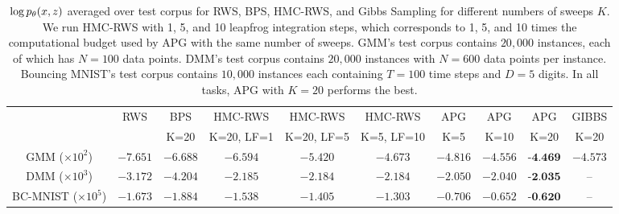 \documentclass{article}
\theoremstyle{definition}
\begin{document}
\begin{table}[t!]
\centering
\caption{$\log p_\theta (x, z)$ averaged over test corpus for RWS, BPS, HMC-RWS, and Gibbs Sampling for different numbers of sweeps $K$.
We run HMC-RWS with 1, 5, and 10 leapfrog integration steps, which corresponds to 1, 5, and 10 times the computational budget used by APG with the same number of sweeps.
GMM's test corpus contains $20,000$ instances, each of which has $N=100$ data points. DMM's test corpus contains $20,000$ instances with $N=600$ data points per instance. Bouncing MNIST's test corpus contains $10,000$ instances each containing $T=100$ time steps and $D=5$ digits.
In all tasks, APG with $K=20$ performs the best.}
\vspace{0.5em}
\addtolength{\tabcolsep}{-2pt} 
\begin{tabularx}{\textwidth}{cccccccccc}
    \toprule
     & RWS & BPS & HMC-RWS & HMC-RWS & HMC-RWS & APG & APG & APG & GIBBS \\
     & & K=20 & K=20, LF=1 & K=20, LF=5 & K=5, LF=10 & K=5 & K=10 & K=20 & K=20 \\
    \midrule
    GMM ($\times10^2$)& $-7.651$ & $-6.688$ & $-6.594$ & $-5.420$ & $-4.673$ & $-4.816$ & $-4.556$ & $\textbf{-4.469}$ & $-4.573$ \\
    DMM ($\times10^3$) & $-3.172$ & $-4.204$ & $-2.185$ & $-2.184$ & $-2.184$ & $-2.050$ & $-2.040$ & $\textbf{-2.035}$ & -- \\
    BC-MNIST ($\times10^5$) & $-1.673$ & $-1.884$ & $-1.538$ & $-1.405$ & $-1.303$ & $-0.706$ & $-0.652$ & $\textbf{-0.620}$ & --\\
    \bottomrule
\end{tabularx}
\label{table:log-joint-all}
\end{table}
\end{document}
